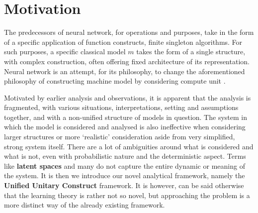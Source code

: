 \section{Motivation}
The predecessors of neural network, for operations and purposes, take in the form of a specific application of function constructs, finite singleton algorithms. For such purposes, a specific classical model $m$ takes the form of a single structure, with complex construction, often offering fixed architecture of its representation. Neural network is an attempt, for its philosophy, to change the aforementioned philosophy of constructing machine model by considering compute unit \cite{mcculloch_logical_1943,Rosenblatt1958ThePA}. 

Motivated by earlier analysis and observations, it is apparent that the analysis is fragmented, with various situations, interpretations, setting and assumptions together, and with a non-unified structure of models in question. The system in which the model is considered and analysed is also ineffective when considering larger structures or more `realistic' consideration aside from very simplified, strong system itself. There are a lot of ambiguities around what is considered and what is not, even with probabilistic nature and the deterministic aspect. Terms like \textbf{latent spaces} and many do not capture the entire dynamic or meaning of the system. It is then we introduce our novel analytical framework, namely the \textbf{Unified Unitary Construct} framework. It is however, can be said otherwise that the learning theory is rather not so novel, but approaching the problem is a more distinct way of the already existing framework. 

